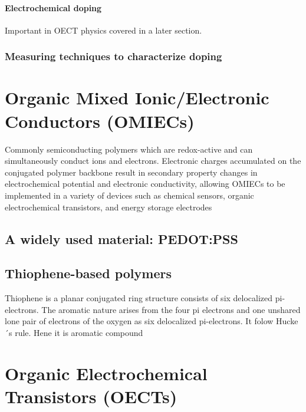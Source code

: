 \paragraph{Electrochemical doping}
Important in OECT physics covered in a later section.

\subsubsection{Measuring techniques to characterize doping}

\section{Organic Mixed Ionic/Electronic Conductors (OMIECs)}

Commonly semiconducting polymers which are redox-active and can simultaneously conduct ions and electrons. Electronic charges accumulated on the conjugated polymer backbone result in secondary property changes in electrochemical potential and electronic conductivity, allowing OMIECs to be implemented in a variety of devices such as chemical sensors, organic electrochemical transistors, and energy storage electrodes \cite{tan_organic_2022}

\subsection{A widely used material: PEDOT:PSS}

\subsection{Thiophene-based polymers}
Thiophene is a planar conjugated ring structure consists of six delocalized pi-electrons. The aromatic nature arises from the four pi electrons and one unshared lone pair of electrons of the oxygen as six delocalized pi-electrons. It folow Hucke´s rule. Hene it is aromatic compound



\section{Organic Electrochemical Transistors (OECTs)}

